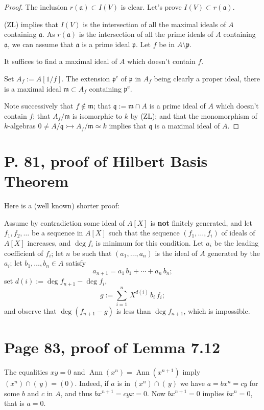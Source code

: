 \documentclass[12pt]{article}
\newcommand{\oo}{\operatorname}
\newcommand{\mf}{\mathfrak}
\newcommand{\mono}{\rightarrowtail}
\begin{document}
\begin{proof} The inclusion $r(\mf a)\subset I(V)$ is clear. Let's prove $I(V)\subset r(\mf a)$. 

(ZL) implies that $I(V)$ is the intersection of all the maximal ideals of $A$ containing $\mf a$. As $r(\mf a)$ is the intersection of all the prime ideals of $A$ containing $\mf a$, we can assume that $\mf a$ is a prime ideal $\mf p$. Let $f$ be in $A\setminus\mf p$. 

It suffices to find a maximal ideal of $A$ which doesn't contain $f$. 

Set $A_f:=A[1/f]$. The extension $\mf p^{\oo e}$ of $\mf p$ in $A_f$ being clearly a proper ideal, there is a maximal ideal $\mf m\subset A_f$ containing $\mf p^{\oo e}$. 

Note successively that $f\notin\mf m$; that $\mf q:=\mf m\cap A$ is a prime ideal of $A$ which doesn't contain $f$; that $A_f/\mf m$ is isomorphic to $k$ by (ZL); and that the monomorphism of $k$-algebras $0\ne A/\mf q\mono A_f/\mf m\simeq k$ implies that $\mf q$ is a maximal ideal of $A$.
\end{proof}

\section{P. 81, proof of Hilbert Basis Theorem}%

Here is a (well known) shorter proof:

Assume by contradiction some ideal %
of $A[X]$ is \textbf{not} finitely generated, and let $f_1,f_2,\dots$ be a sequence in $A[X]$ such that the sequence $(f_1,\dots,f_i)$ of ideals of $A[X]$ increases, and $\deg f_i$ is minimum for this condition. Let $a_i$ be the leading coefficient of $f_i$; let $n$ be such that $(a_1,\dots,a_n)$ is the ideal of $A$ generated by the $a_i$; let $b_1,\dots,b_n\in A$ satisfy 
$$
a_{n+1}=a_1\,b_1+\cdots+a_n\,b_n;
$$ 
set $d(i):=\deg f_{n+1}-\deg f_i$, 
$$
g:=\sum_{i=1}^n\,X^{d(i)}\,b_i\,f_i;
$$ 
and observe that $\deg(f_{n+1}-g)$ is less than $\deg f_{n+1}$, which is impossible.

\section{Page 83, proof of Lemma 7.12}%

The equalities $xy=0$ and $\oo{Ann}(x^n)=\oo{Ann}(x^{n+1})$ imply $(x^n)\cap(\,y)=(0)$. Indeed, if $a$ is in $(x^n)\cap(\,y)$ we have $a=bx^n=cy$ for some $b$ and $c$ in $A$, and thus $bx^{n+1}=cyx=0$. Now $bx^{n+1}=0$ implies $bx^n=0$, that is $a=0$. 
\end{document}
